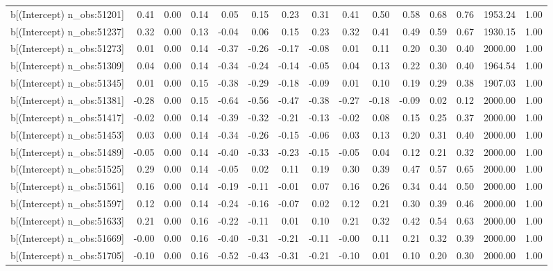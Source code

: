 \begin{table}[ht]
\begin{tabular}{rrrrrrrrrrrrrrr}
  b[(Intercept) n\_obs:51201] & 0.41 & 0.00 & 0.14 & 0.05 & 0.15 & 0.23 & 0.31 & 0.41 & 0.50 & 0.58 & 0.68 & 0.76 & 1953.24 & 1.00 \\ 
  b[(Intercept) n\_obs:51237] & 0.32 & 0.00 & 0.13 & -0.04 & 0.06 & 0.15 & 0.23 & 0.32 & 0.41 & 0.49 & 0.59 & 0.67 & 1930.15 & 1.00 \\ 
  b[(Intercept) n\_obs:51273] & 0.01 & 0.00 & 0.14 & -0.37 & -0.26 & -0.17 & -0.08 & 0.01 & 0.11 & 0.20 & 0.30 & 0.40 & 2000.00 & 1.00 \\ 
  b[(Intercept) n\_obs:51309] & 0.04 & 0.00 & 0.14 & -0.34 & -0.24 & -0.14 & -0.05 & 0.04 & 0.13 & 0.22 & 0.30 & 0.40 & 1964.54 & 1.00 \\ 
  b[(Intercept) n\_obs:51345] & 0.01 & 0.00 & 0.15 & -0.38 & -0.29 & -0.18 & -0.09 & 0.01 & 0.10 & 0.19 & 0.29 & 0.38 & 1907.03 & 1.00 \\ 
  b[(Intercept) n\_obs:51381] & -0.28 & 0.00 & 0.15 & -0.64 & -0.56 & -0.47 & -0.38 & -0.27 & -0.18 & -0.09 & 0.02 & 0.12 & 2000.00 & 1.00 \\ 
  b[(Intercept) n\_obs:51417] & -0.02 & 0.00 & 0.14 & -0.39 & -0.32 & -0.21 & -0.13 & -0.02 & 0.08 & 0.15 & 0.25 & 0.37 & 2000.00 & 1.00 \\ 
  b[(Intercept) n\_obs:51453] & 0.03 & 0.00 & 0.14 & -0.34 & -0.26 & -0.15 & -0.06 & 0.03 & 0.13 & 0.20 & 0.31 & 0.40 & 2000.00 & 1.00 \\ 
  b[(Intercept) n\_obs:51489] & -0.05 & 0.00 & 0.14 & -0.40 & -0.33 & -0.23 & -0.15 & -0.05 & 0.04 & 0.12 & 0.21 & 0.32 & 2000.00 & 1.00 \\ 
  b[(Intercept) n\_obs:51525] & 0.29 & 0.00 & 0.14 & -0.05 & 0.02 & 0.11 & 0.19 & 0.30 & 0.39 & 0.47 & 0.57 & 0.65 & 2000.00 & 1.00 \\ 
  b[(Intercept) n\_obs:51561] & 0.16 & 0.00 & 0.14 & -0.19 & -0.11 & -0.01 & 0.07 & 0.16 & 0.26 & 0.34 & 0.44 & 0.50 & 2000.00 & 1.00 \\ 
  b[(Intercept) n\_obs:51597] & 0.12 & 0.00 & 0.14 & -0.24 & -0.16 & -0.07 & 0.02 & 0.12 & 0.21 & 0.30 & 0.39 & 0.46 & 2000.00 & 1.00 \\ 
  b[(Intercept) n\_obs:51633] & 0.21 & 0.00 & 0.16 & -0.22 & -0.11 & 0.01 & 0.10 & 0.21 & 0.32 & 0.42 & 0.54 & 0.63 & 2000.00 & 1.00 \\ 
  b[(Intercept) n\_obs:51669] & -0.00 & 0.00 & 0.16 & -0.40 & -0.31 & -0.21 & -0.11 & -0.00 & 0.11 & 0.21 & 0.32 & 0.39 & 2000.00 & 1.00 \\ 
  b[(Intercept) n\_obs:51705] & -0.10 & 0.00 & 0.16 & -0.52 & -0.43 & -0.31 & -0.21 & -0.10 & 0.01 & 0.10 & 0.20 & 0.30 & 2000.00 & 1.00 \\ 

\end{tabular}
\end{table}
